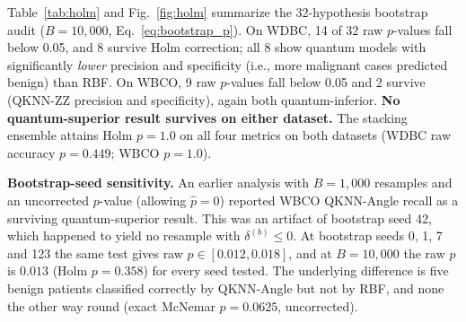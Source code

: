 \documentclass[journal,twocolumn]{IEEEtran}
\begin{document}
Table~\ref{tab:holm} and Fig.~\ref{fig:holm} summarize the 32-hypothesis bootstrap audit ($B=10{,}000$, Eq.~\eqref{eq:bootstrap_p}). On WDBC, 14 of 32 raw $p$-values fall below 0.05, and 8 survive Holm correction; all 8 show quantum models with significantly \emph{lower} precision and specificity (i.e., more malignant cases predicted benign) than RBF. On WBCO, 9 raw $p$-values fall below 0.05 and 2 survive (QKNN-ZZ precision and specificity), again both quantum-inferior. \textbf{No quantum-superior result survives on either dataset.} The stacking ensemble attains Holm $p = 1.0$ on all four metrics on both datasets (WDBC raw accuracy $p=0.449$; WBCO $p=1.0$).

\textbf{Bootstrap-seed sensitivity.} An earlier analysis with $B=1{,}000$ resamples and an uncorrected $p$-value (allowing $\hat{p}=0$) reported WBCO QKNN-Angle recall as a surviving quantum-superior result. This was an artifact of bootstrap seed 42, which happened to yield no resample with $\delta^{(b)}\le0$. At bootstrap seeds 0, 1, 7 and 123 the same test gives raw $p \in [0.012, 0.018]$, and at $B=10{,}000$ the raw $p$ is $0.013$ (Holm $p = 0.358$) for every seed tested. The underlying difference is five benign patients classified correctly by QKNN-Angle but not by RBF, and none the other way round (exact McNemar $p = 0.0625$, uncorrected).
\end{document}
